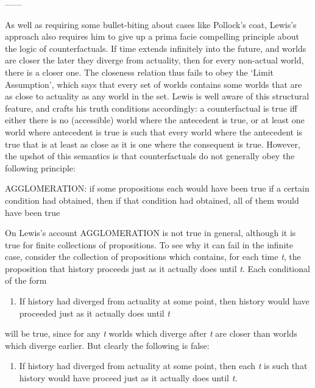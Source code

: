 ------

As well as requiring some bullet-biting about cases like Pollock's coat,
Lewis's approach also requires him to give up a prima facie compelling
principle about the logic of counterfactuals. If time extends infinitely
into the future, and worlds are closer the later they diverge from
actuality, then for every non-actual world, there is a closer one. The
closeness relation thus fails to obey the `Limit Assumption', which says
that every set of worlds contains some worlds that are as close to
actuality as any world in the set. Lewis is well aware of this
structural feature, and crafts his truth conditions accordingly: a
counterfactual is true iff either there is no (accessible) world where
the antecedent is true, or at least one world where antecedent is true
is such that every world where the antecedent is true that is at least
as close as it is one where the consequent is true. However, the upshot
of this semantics is that counterfactuals do not generally obey the
following principle:

AGGLOMERATION: if some propositions each would have been true if a
certain condition had obtained, then if that condition had obtained, all
of them would have been true

On Lewis's account AGGLOMERATION is not true in general, although it is
true for finite collections of propositions. To see why it can fail in
the infinite case, consider the collection of propositions which
contains, for each time \emph{t}, the proposition that history proceeds
just as it actually does until \emph{t}. Each conditional of the form

\begin{enumerate}
\def\labelenumi{(\arabic{enumi})}
\setcounter{enumi}{50}
\itemsep1pt\parskip0pt
\item
  If history had diverged from actuality at some point, then history
  would have proceeded just as it actually does until \emph{t}
\end{enumerate}

will be true, since for any \emph{t} worlds which diverge after \emph{t}
are closer than worlds which diverge earlier. But clearly the following
is false:

\begin{enumerate}
\def\labelenumi{(\arabic{enumi})}
\setcounter{enumi}{51}
\itemsep1pt\parskip0pt
\item
  If history had diverged from actuality at some point, then each
  \emph{t} is such that history would have proceed just as it actually
  does until \emph{t.}
\end{enumerate}

